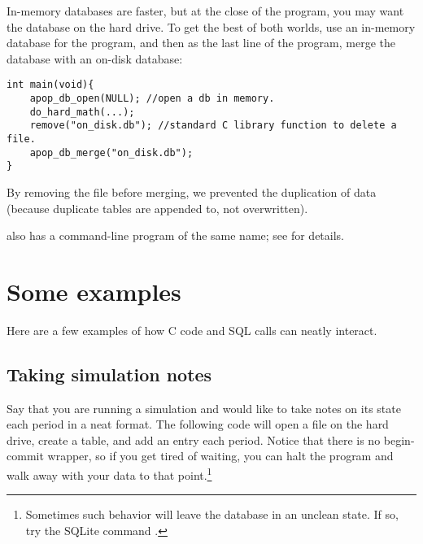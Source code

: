In-memory databases are faster, but at the close of the program, you
may want the database on the hard drive. To get the best of both
worlds, use an in-memory database for the program, and then as the last
line of the program, merge the database with an on-disk database:
\begin{lstlisting}
int main(void){
    apop_db_open(NULL); //open a db in memory.
    do_hard_math(...);
    remove("on_disk.db"); //standard C library function to delete a file.
    apop_db_merge("on_disk.db");
}
\end{lstlisting}
By removing the file before merging, we prevented the duplication of
data (because duplicate tables are appended to, not overwritten).

 also has a command-line program of the
same name; see  for details.



\section{Some examples} 
Here are a few examples of how C code and SQL calls can neatly interact.

\subsection{Taking simulation notes}\label{createeg}
Say that you are running a simulation and would like to take notes on
its state each period in a neat format. The following code will open a
file on the hard drive, create a table, and add an entry each period.
Notice that there is no begin-commit wrapper, so if you get tired of
waiting, you can halt the program and walk away with
your data to that point.\footnote{Sometimes such behavior will leave the database in
an unclean state. If so, try the SQLite command .}


